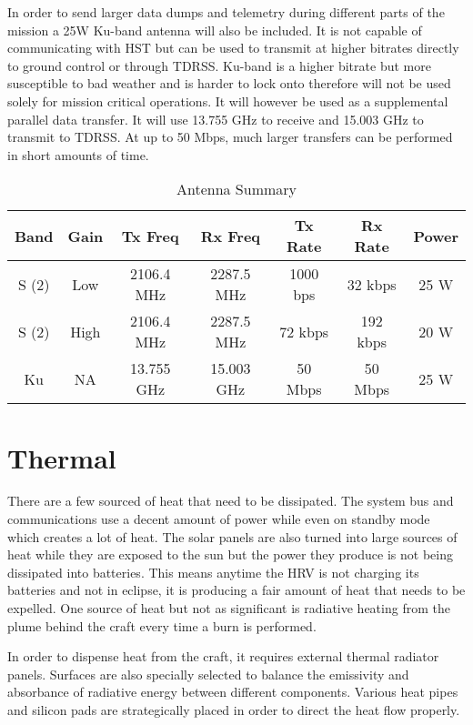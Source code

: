 \documentclass[onecolumn,10pt]{jhwhw}
\begin{document}
In order to send larger data dumps and telemetry during different parts of the mission a 25W Ku-band antenna will also be included. It is not capable of communicating with HST but can be used to transmit at higher bitrates directly to ground control or through TDRSS. Ku-band is a higher bitrate but more susceptible to bad weather and is harder to lock onto therefore will not be used solely for mission critical operations. It will however be used as a supplemental parallel data transfer. It will use 13.755 GHz to receive and 15.003 GHz to transmit to TDRSS. At up to 50 Mbps, much larger transfers can be performed in short amounts of time.

\begin{table}[h]
\begin{center}
\begin{tabular}{c c c c c c c}
\toprule
Band & Gain & Tx Freq & Rx Freq & Tx Rate & Rx Rate & Power  \\
\midrule
S (2) & Low & 2106.4 MHz & 2287.5 MHz & 1000 bps & 32 kbps & 25 W \\
S (2) & High & 2106.4 MHz & 2287.5 MHz & 72 kbps & 192 kbps & 20 W \\
Ku & NA & 13.755 GHz & 15.003 GHz & 50 Mbps & 50 Mbps & 25 W \\

\bottomrule
\end{tabular}
\end{center}
\caption{Antenna Summary}
\end{table}


\chapter{Thermal}
There are a few sourced of heat that need to be dissipated. The system bus and communications use a decent amount of power while even on standby mode which creates a lot of heat. The solar panels are also turned into large sources of heat while they are exposed to the sun but the power they produce is not being dissipated into batteries. This means anytime the HRV is not charging its batteries and not in eclipse, it is producing a fair amount of heat that needs to be expelled. One source of heat but not as significant is radiative heating from the plume behind the craft every time a burn is performed.

In order to dispense heat from the craft, it requires external thermal radiator panels. Surfaces are also specially selected to balance the emissivity and absorbance of radiative energy between different components. Various heat pipes and silicon pads are strategically placed in order to direct the heat flow properly.
\end{document}
